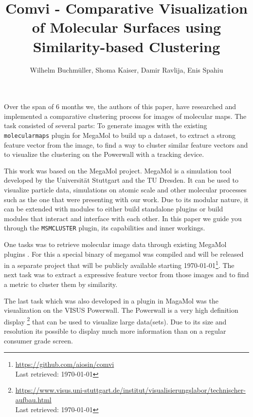\documentclass[journal]{vgtc}       %
\title{Comvi - Comparative Visualization of Molecular Surfaces using Similarity-based Clustering}
\author{Wilhelm Buchm\"uller, Shoma Kaiser, Damir Ravlija, Enis Spahiu}
\newcommand{\todo}[1]{\textcolor{red}{\textbf{TODO:} #1}}
\begin{document}

\label{sec:intro}
%
\maketitle
%
Over the span of 6 months we, the authors of this paper,  have researched and implemented a comparative clustering  process for images of molecular maps.
The task consisted of several parts: To generate images with the existing \verb|molecularmaps| plugin for MegaMol \cite{MegaMol} to build up a dataset, to extract a strong feature vector from the image, to find a way to cluster similar feature vectors and to visualize the clustering on the Powerwall with a tracking device.

This work was based on the MegaMol\cite{MegaMol} project. MegaMol is a simulation tool developed by the Universit\"at Stuttgart and the TU Dresden. It can be used to visualize particle data, simulations on atomic scale and other molecular processes such as the one that were presenting with our work. 
Due to its modular nature, it can be extended with modules to either build standalone plugins or build modules that interact and interface with each other.
In this paper we guide you through the \verb|MSMCLUSTER| plugin, its capabilities and inner workings.

One tasks was to retrieve molecular image data through existing MegaMol plugins \cite{molecularmaps}. For this a special binary of megamol was compiled and will be released in a separate project that will be publicly available starting \today \footnote{\url{https://github.com/aiosin/comvi}\\ Last retrieved: \today}.
The next task was to extract a expressive feature vector from those images and to find a metric to cluster them by similarity.

The last task which was also developed in a plugin in MagaMol was the visualization on the VISUS Powerwall. The Powerwall is a very high definition display \footnote{\url{https://www.visus.uni-stuttgart.de/institut/visualisierungslabor/technischer-aufbau.html} \\ Last retrieved: \today } that can be used to visualize large data(sets). Due to its size and resolution its possible to display much more information than on a regular consumer grade screen. 
\end{document}
